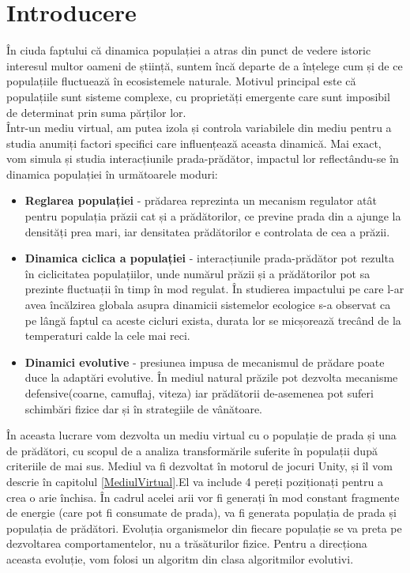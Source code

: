 \chapter*{Introducere} 
În ciuda faptului că dinamica populației a atras din punct de vedere istoric interesul multor oameni de știință, suntem încă departe de a înțelege cum și de ce populațiile fluctuează în ecosistemele naturale. Motivul principal este că populațiile sunt sisteme complexe, cu proprietăți emergente care sunt imposibil de determinat prin suma părților lor.\cite{ChallengesInPopulationDynamics}\\
Într-un mediu virtual, am putea izola și controla variabilele din mediu pentru a studia anumiți factori specifici care influențează aceasta dinamică. Mai exact, vom simula și studia interacțiunile prada-prădător, impactul lor reflectându-se în dinamica populației în următoarele moduri:
\begin{itemize}
    \item \textbf{Reglarea populației} - prădarea reprezinta un mecanism regulator atât pentru populația prăzii cat și a prădătorilor, ce previne prada din a ajunge la densități prea mari, iar densitatea prădătorilor e controlata de cea a prăzii.
    \item \textbf{Dinamica ciclica a populației} - interacțiunile prada-prădător pot rezulta în ciclicitatea populațiilor, unde numărul prăzii și a prădătorilor pot sa prezinte fluctuații în timp în mod regulat. În studierea impactului pe care l-ar avea încălzirea globala asupra dinamicii sistemelor ecologice s-a observat ca pe lângă faptul ca aceste cicluri exista, durata lor se micșorează trecând de la temperaturi calde la cele mai reci\cite{TemperatureCycle}.
    \item \textbf{Dinamici evolutive} - presiunea impusa de mecanismul de prădare poate duce la adaptări evolutive. În mediul natural prăzile pot dezvolta mecanisme defensive(coarne, camuflaj, viteza) iar prădătorii de-asemenea pot suferi schimbări fizice dar și în strategiile de vânătoare.
\end{itemize}

În aceasta lucrare vom dezvolta un mediu virtual cu o populație de prada și una de prădători, cu scopul de a analiza transformările suferite în populații după criteriile de mai sus. Mediul va fi dezvoltat în motorul de jocuri Unity, și îl vom descrie în capitolul \ref{MediulVirtual}.El va include 4 pereți poziționați pentru a crea o arie închisa. În cadrul acelei arii vor fi generați în mod constant fragmente de energie (care pot fi consumate de prada), va fi generata populația de prada și populația de prădători. Evoluția organismelor din fiecare populație se va preta pe dezvoltarea comportamentelor, nu a trăsăturilor fizice. Pentru a direcționa aceasta evoluție, vom folosi un algoritm din clasa algoritmilor evolutivi.

